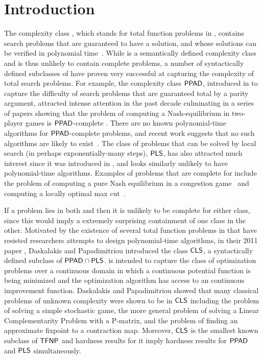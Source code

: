 
\section{Introduction}

The complexity class \TFNP, which stands for total function problems in
\NP, contains search problems that are guaranteed to have a solution, and whose
solutions can be verified in polynomial time~\cite{megiddo1991total}.
%
While \TFNP is a semantically defined complexity class and is thus unlikely to
contain complete problems, a number of syntactically defined subclasses of
\TFNP have proven very successful at capturing the complexity of total search 
problems.
For example, the complexity class $\mathsf{PPAD}$, introduced in
\cite{papadimitriou1994complexity} to capture the difficulty of search problems
that are guaranteed total by a parity argument, attracted intense attention in
the past decade culminating in a series of papers showing that the problem of
computing a Nash-equilibrium in two-player games is $\mathsf{PPAD}$-complete
\cite{chen2009settling,daskalakis2009complexity}. There are no known
polynomial-time algorithms for $\mathsf{PPAD}$-complete problems, and recent work
suggests that no such algorithms are likely to exist~\cite{bitansky2015cryptographic,garg2016revisiting}. 
The class of problems that
can be solved by local search (in perhaps exponentially-many steps), $\mathsf{PLS}$,
has also attracted much interest since it was introduced in
\cite{johnson1988easy}, and looks similarly unlikely to have polynomial-time
algorithms. Examples of problems that are complete for \PLS include the problem
of computing a pure Nash equilibrium in a congestion
game~\cite{fabrikant2004complexity} and computing a locally optimal max
cut~\cite{schaffer1991simple}.

If a problem lies in both \PPAD and \PLS then it is unlikely to be complete for 
either class, since this would imply a extremely surprising containment of one class in the other.
Motivated by the existence of several total function problems in \PPADPLS
that have resisted researchers attempts to design polynomial-time algorithms,
in their 2011 paper \cite{daskalakis2011continuous}, Daskalakis and Papadimitriou introduced
the class $\mathsf{CLS}$, a syntactically defined subclass of $\mathsf{PPAD} \cap \mathsf{PLS}$.
\CLS is intended to capture the class of optimization problems over a continuous
domain in which a continuous potential function is being minimized and the
optimization algorithm has access to an continuous improvement function.
Daskalakis and Papadimitriou showed that many classical problems of unknown
complexity were shown to be in $\mathsf{CLS}$ including the problem of solving a simple
stochastic game, the more general problem of solving a Linear Complementarity
Problem with a P-matrix, and the problem of finding an approximate fixpoint
to a contraction map. Moreover, $\mathsf{CLS}$ is the smallest known subclass of
$\mathsf{TFNP}$ and hardness results for it imply hardness results for
$\mathsf{PPAD}$ and $\mathsf{PLS}$ simultaneously. 

